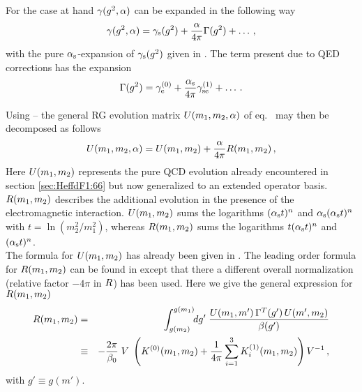 For the case at hand $\gamma(g^2,\alpha)$ can be expanded in the following way
\begin{equation}
\gamma(g^2,\alpha) = \gamma_{\rm s}(g^2) + \frac{\alpha}{4\pi} \Gamma(g^2) + \ldots \, ,
\label{eq:gexpdF1:1010}
\end{equation}
with the pure $\alpha_{\rm s}$-expansion of $\gamma_{\rm s}(g^2)$ given in
. The term present due to QED corrections has the
expansion
\begin{equation}
\Gamma(g^2) = \gamma_{\rm e}^{(0)} + \frac{\alpha_{\rm s}}{4\pi} \gamma_{\rm se}^{(1)} + \ldots  \, .
\label{eq:GexpdF1:1010}
\end{equation}

Using -- the general RG
evolution matrix $U(m_1,m_2,\alpha)$ of eq.~ may then
be decomposed as follows
\begin{equation}
U(m_1,m_2,\alpha) =
U(m_1,m_2) + \frac{\alpha}{4\pi} R(m_1,m_2) \, ,
\label{eq:UdF1:1010}
\end{equation}
Here $U(m_1,m_2)$ represents the pure QCD evolution already
encountered in section \ref{sec:HeffdF1:66} but now generalized to an
extended operator basis. $R(m_1,m_2)$ describes the additional
evolution in the presence of the electromagnetic interaction.
$U(m_1,m_2)$ sums the logarithms $(\alpha_{\rm s} t)^n$ and $\alpha_{\rm s} (\alpha_{\rm s} t)^n$ with
$t=\ln(m_2^2/m_1^2)$, whereas $R(m_1,m_2)$ sums the logarithms $t (\alpha_{\rm s}
t)^n$ and $(\alpha_{\rm s} t)^n$. \\
The formula for $U(m_1,m_2)$ has already been given in
.  The leading order formula for $R(m_1,m_2)$ can be
found in \cite{buchallaetal:90} except that there a different
overall normalization (relative factor $-4\pi$ in $R$) has been
used.  Here we give the general expression for $R(m_1,m_2)$
\cite{burasetal:92d}
\begin{eqnarray}
R(m_1,m_2) &=& \int_{g(m_2)}^{g(m_1)} \!\! dg' \;
                 \frac{U(m_1,m') \, \Gamma^T(g') \, U(m',m_2)}{\beta(g')}
\label{eq:RdF1:1010} \\
        &\equiv& -\frac{2\pi}{\beta_0} \; V \; \left(
                 K^{(0)}(m_1,m_2) +
                 \frac{1}{4\pi} \sum_{i=1}^{3} K_i^{(1)}(m_1,m_2)
                 \right) V^{-1} \, , \nonumber
\end{eqnarray}
with $g' \equiv g(m')$.

